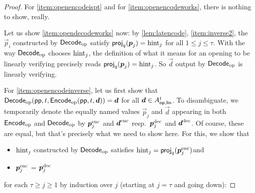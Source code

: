 \begin{proof}
For \autoref{item:openencodeispt} and for \autoref{item:openencodeworks}, there is nothing to show, really.

\bigskip\noindent
Let us show \autoref{item:opendecodeworks} now:
by \autoref{lem:latencode}, \autoref{item:inverse2}, the $\vec{p}_i$ constructed by $\mathsf{Decode}_{\mathrm{op}}$ satisfy $\mathsf{proj}_{q}(\boldsymbol{p}_j) = \mathrm{hint}_j$ for all $1\leq j \leq \tau$.
With the way $\mathsf{Decode}_{\mathrm{op}}$ chooses $\mathrm{hint}_j$, the definition of what it means for an opening to be linearly verifying precisely reads $\mathsf{proj}_{q}(\boldsymbol{p}_j) = \mathrm{hint}_j$. So $\vec{d}$ output by $\mathsf{Decode}_{\mathrm{op}}$ is linearly verifying.


\bigskip\noindent
For \autoref{item:openencodeinverse}, let us first show that $\mathsf{Decode}_{\mathrm{op}}(\mathsf{pp}, t, \mathsf{Encode}_{\mathrm{op}}(\mathsf{pp},t, \boldsymbol{d})) = \boldsymbol{d}$ for all $\boldsymbol{d}\in A_{\mathsf{op,lin}}^{t}$.
To disambiguate, we temporarily denote the equally named values $\vec{p}_j$ and $\vec{d}$ appearing in both $\mathsf{Encode}_{\mathrm{op}}$ and $\mathsf{Decode}_{\mathrm{op}}$ by $\boldsymbol{p}_j^{\mathrm{enc}}$ and $\boldsymbol{d}^{\mathrm{enc}}$ resp.\ $\boldsymbol{p}_j^{\mathrm{dec}}$ and $\boldsymbol{d}^{\mathrm{dec}}$.
Of course, these are equal, but that's precisely what we need to show here. For this, we show that
\begin{itemize}
 \item $\mathrm{hint}_j$ constructed by $\mathsf{Decode}_{\mathrm{op}}$ satisfies $\mathrm{hint}_j = \mathsf{proj}_{q}(\boldsymbol{p}_j^{\mathrm{enc}})$\qquad and %
 \item $\boldsymbol{p}_j^{\mathrm{enc}}$ = $\boldsymbol{p}_j^{\mathrm{dec}}$
\end{itemize}
for each $\tau \geq j \geq 1$ by induction over $j$ (starting at $j=\tau$ and going down):


\end{proof}
